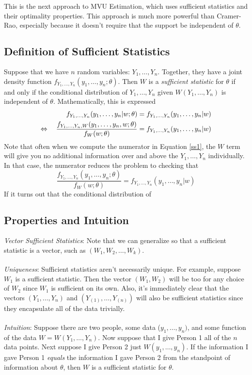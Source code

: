 \documentclass[a4paper,12pt]{scrartcl}
\begin{document}
This is the next approach to MVU Estimation, which uses sufficient
statistics and their optimality properties. This approach is 
much more powerful than Cramer-Rao, especially because it doesn't 
require that the support be independent of $\theta$.

\subsection{Definition of Sufficient Statistics}

Suppose that we have $n$ random variables: $Y_1, \ldots, Y_n$. Together,
they have a joint density function $f_{Y_1,\dots,Y_n}(y_1, \ldots, y_n ; 
\theta).$
Then $W$ is a \emph{sufficient statistic} for $\theta$ if and only
if the conditional distribution of $Y_1, \ldots, Y_n$ given 
$W(Y_1, \ldots, Y_n)$ is independent of $\theta$. Mathematically, this
is expressed
\begin{align}
   \label{ss1}
   f_{Y_1,\dots,Y_n}(y_1, \ldots, y_n | w; \theta) &= 
   f_{Y_1,\dots,Y_n}(y_1, \ldots, y_n | w) \notag\\
   \Leftrightarrow \quad
   \frac{f_{Y_1,\dots,Y_n, W}(y_1, \ldots, y_n,  w; \theta)}{
	  f_{W}(w; \theta) } &= 
      f_{Y_1,\dots,Y_n}(y_1, \ldots, y_n | w)
\end{align}
Note that often when we compute the numerator in Equation \ref{ss1},
the $W$ term will give you no additional information 
over and above the $Y_1, \ldots, Y_n$ individually.  In that case,
the numerator reduces the problem to checking that
\begin{equation}
   \label{ss3}
   \frac{f_{Y_1,\dots,Y_n}(y_1, \ldots, y_n; \theta)}{f_W(w;\theta)}
      =f_{Y_1,\dots,Y_n}(y_1, \ldots, y_n | w)
\end{equation}
If it turns out that the conditional distribution of 

\subsection{Properties and Intuition}

{\sl Vector Sufficient Statistics}:
Note that we can generalize so that a sufficient statistic is a vector,
such as $(W_1, W_2, \ldots, W_k)$. 
\\
\\
{\sl Uniqueness}: Sufficient statistics aren't 
necessarily unique. For example, suppose $W_1$ is a sufficient statistic.
Then the vector $(W_1, W_2)$ will be too for any choice of $W_2$
since $W_1$ is sufficient on its own. Also, it's immediately clear that
the vectors $(Y_1, \ldots, Y_n)$ and $(Y_{(1)}, \ldots, Y_{(n)})$ will
also be sufficient statistics since they encapsulate all of the data
trivially.
\\
\\
{\sl Intuition}:
Suppose there are two people, some data ($y_1, \ldots, y_n)$, and
some function of the data $W=W(Y_1, \ldots, Y_n)$. Now suppose that
I give Person 1 all of the $n$ data points. Next suppose I give
Person 2 just $W(y_1, \ldots, y_n)$. If the information I gave 
Person 1 \emph{equals} the information I gave Person 2 from 
the standpoint of information about $\theta$, then $W$ is a sufficient
statistic for $\theta$.
\end{document}
